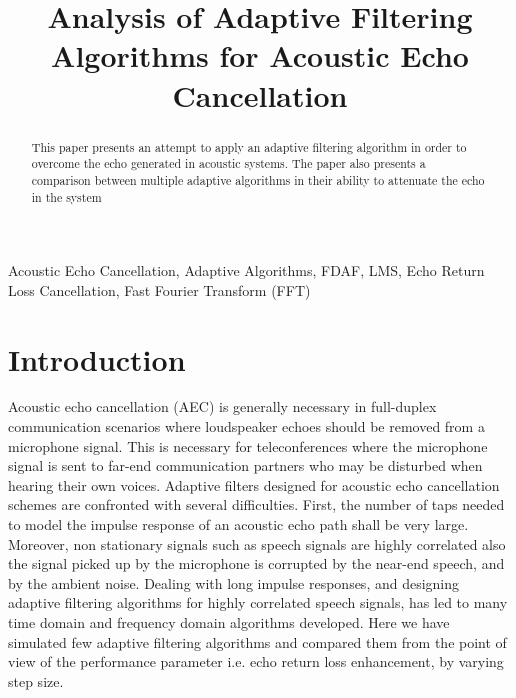 \documentclass[conference]{IEEEtran}
\begin{document}
\title{\LARGE Analysis of Adaptive Filtering Algorithms for Acoustic Echo Cancellation}


\author{
}



\maketitle

\begin{abstract}
This paper presents an attempt to apply an adaptive filtering algorithm in order to overcome the echo generated in acoustic systems. The paper also presents a comparison between multiple adaptive algorithms in their ability to attenuate the echo in the system
\end{abstract}

\hspace{0.25em}
\IEEEoverridecommandlockouts

\begin{keywords}
Acoustic Echo Cancellation, Adaptive Algorithms, FDAF, LMS, Echo Return Loss Cancellation, Fast Fourier Transform (FFT)
\end{keywords}
\IEEEpeerreviewmaketitle


\section{Introduction}
Acoustic echo cancellation (AEC) is generally necessary in full-duplex communication scenarios where loudspeaker echoes should be removed from a microphone signal. This is necessary for teleconferences where the microphone signal is sent to far-end communication partners who may be disturbed when hearing their own voices. Adaptive filters designed for acoustic echo cancellation schemes are confronted with several difficulties. First, the number of taps needed to model the impulse response of an acoustic echo path shall be very large. Moreover, non stationary signals such as speech signals are highly correlated also the signal picked up by the microphone is corrupted by the near-end speech, and by the ambient noise. Dealing with long impulse responses, and designing adaptive filtering algorithms for highly correlated speech signals, has led to many time domain and frequency domain algorithms developed. Here we have simulated few adaptive filtering algorithms and compared them from the point of view of the performance parameter i.e. echo return loss enhancement, by varying step size.
\end{document}
